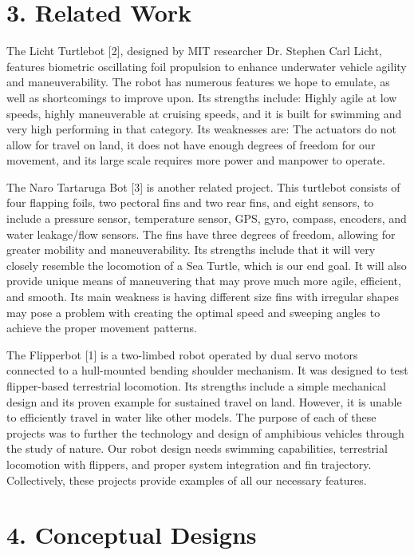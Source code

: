 \documentclass[10pt]{article}
\begin{document}
\section{3. Related Work}
The Licht Turtlebot [2], designed by MIT researcher Dr. Stephen Carl Licht, features biometric oscillating foil propulsion to enhance underwater vehicle agility and maneuverability. The robot has numerous features we hope to emulate, as well as shortcomings to improve upon. Its strengths include: Highly agile at low speeds, highly maneuverable at cruising speeds, and it is built for swimming and very high performing in that category. Its weaknesses are: The actuators do not allow for travel on land, it does not have enough degrees of freedom for our movement, and its large scale requires more power and manpower to operate. 

The Naro Tartaruga Bot [3] is another related project. This turtlebot consists of four flapping foils, two pectoral fins and two rear fins, and eight sensors, to include a pressure sensor, temperature sensor, GPS, gyro, compass, encoders, and water leakage/flow sensors. The fins have three degrees of freedom, allowing for greater mobility and maneuverability. Its strengths include that it will very closely resemble the locomotion of a Sea Turtle, which is our end goal. It will also provide unique means of maneuvering that may prove much more agile, efficient, and smooth. Its main weakness is having different size fins with irregular shapes may pose a problem with creating the optimal speed and sweeping angles to achieve the proper movement patterns.

The Flipperbot [1] is a two-limbed robot operated by dual servo motors connected to a hull-mounted bending shoulder mechanism. It was designed to test flipper-based terrestrial locomotion. Its strengths include a simple mechanical design and its proven example for sustained travel on land. However, it is unable to efficiently travel in water like other models. 
The purpose of each of these projects was to further the technology and design of amphibious vehicles through the study of nature. Our robot design needs swimming capabilities, terrestrial locomotion with flippers, and proper system integration and fin trajectory. Collectively, these projects provide examples of all our necessary features. 

\section{4. Conceptual Designs}
\end{document}
